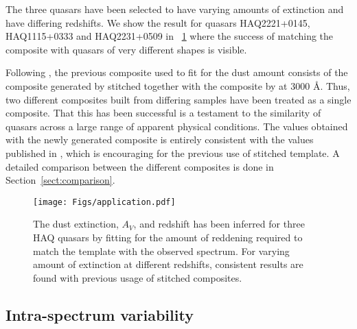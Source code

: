 \documentclass{aa}    %
\newcommand{\figref}[1]{\ref{fig:#1}}
\newcommand{\Fig}[1]{\figurename~\figref{#1}}
\newcommand{\fig}[1]{\Fig{#1}}
\newcommand{\figlabel}[1]{\label{fig:#1}}
\newcommand{\sectionname}{Section}
\newcommand{\Sect}[1]{\sectionname~\ref{sect:#1}}
\newcommand{\sect}[1]{\Sect{#1}}
\newcommand{\sectlabel}[1]{\label{sect:#1}}
\begin{document}
The three quasars have been selected to have varying amounts of extinction and have differing redshifts. We show the result for quasars HAQ2221+0145, HAQ1115+0333 and HAQ2231+0509 in \fig{application} where the success of matching the composite with quasars of very different shapes is visible. 

Following \cite{Wang2012}, the previous composite used to fit for the dust amount consists of the composite generated by \cite{VandenBerk2001} stitched together with the composite by \cite{Glikman2006} at 3000 \AA. Thus, two different composites built from differing samples have been treated as a single composite. That this has been successful is a testament to the similarity of quasars across a large range of apparent physical conditions. 
The values obtained with the newly generated composite is entirely consistent with the values published in \cite{Krogager2015}, which is encouraging for the previous use of stitched template. A detailed comparison between the different composites is done in \sect{comparison}.

\begin{figure}[hbtp]
 \centering
 \texttt{[image: Figs/application.pdf]}
 \caption[]{The dust extinction, $A_V$, and redshift has been inferred for three HAQ quasars by fitting for the amount of reddening required to match the template with the observed spectrum. For varying amount of extinction at different redshifts, consistent results are found with previous usage of stitched composites.}
 \figlabel{application}
\end{figure}
 
 \subsection{Intra-spectrum variability}  \sectlabel{variability}
 
\end{document}
